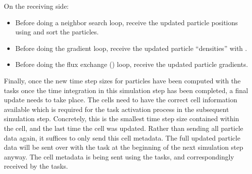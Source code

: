 On the receiving side:

\begin{itemize}
 \item Before doing a neighbor search loop, receive the updated particle positions using
 and sort the particles.
 \item Before doing the gradient loop, receive the updated particle ``densities'' with
.
 \item Before doing the flux exchange () loop, receive the updated particle
gradients.
\end{itemize}


Finally, once the new time step sizes for particles have been computed with the 
tasks once the time integration in this simulation step has been completed, a final update needs to
take place. The  cells need to have the correct cell information available which is
required for the task activation process in the subsequent simulation step. Concretely, this is the
smallest time step size contained within the cell, and the last time the cell was updated. Rather
than sending all particle data again, it suffices to only send this cell metadata. The full updated
particle data will be sent over with the  task at the beginning of the next
simulation step anyway. The cell metadata is being sent using the  tasks, and
correspondingly received by the  tasks.


























